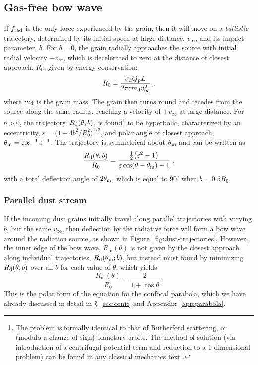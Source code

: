 \subsection{Gas-free bow wave}
\label{sec:gas-free-bow}


If \(f_{\text{rad}}\) is the only force experienced by the grain, then it will
move on a \textit{ballistic} trajectory, determined by its initial
speed at large distance, \(v_\infty\), and its impact parameter, \(b\).
For \(b = 0\), the grain radially approaches the source with initial
radial velocity \(-v_\infty\), which is decelerated to zero at the distance
of closest approach, \(R_0\), given by energy conservation:
\begin{equation}
  \label{eq:dust-r0}
  R_0 = \frac{\sigma_{\text{d}} Q_{\text{p}} L} {2 \pi c m_{\text{d}} v_\infty^2} \ ,
\end{equation}
where \(m_{\text{d}}\) is the grain mass.  The grain then turns round and
recedes from the source along the same radius, reaching a velocity of
\(+v_\infty\) at large distance.  For \(b > 0\), the trajectory,
\(R_{\text{d}}(\theta; b)\), is found\footnote{%
  The problem is formally identical to that of Rutherford scattering,
  or (modulo a change of sign) planetary orbits.  The method of
  solution (via introduction of a centrifugal potential term and
  reduction to a 1-dimensional problem) can be found in any classical
  mechanics text \citep[e.g.,][\S~14]{Landau:1976a}.} %
to be hyperbolic, characterized by an eccentricity,
\(\varepsilon = \bigl( 1 + 4 b^2 / R_0^2\bigr)^{1/2}\), and polar angle of
closest approach, \(\theta_{\text{m}} = \cos^{-1} \varepsilon^{-1}\).  The trajectory is
symmetrical about \(\theta_{\text{m}}\) and can be written as
\begin{equation}
  \label{eq:dust-r-theta}
  \frac{R_{\text{d}}(\theta; b)} {R_0} = 
  \frac{ \tfrac12 \bigl( \varepsilon^2 - 1 \bigr)} {\varepsilon \cos(\theta - \theta_{\text{m}}) - 1} \ , 
\end{equation}
with a total deflection angle of \(2 \theta_{\text{m}}\), which is equal to
\(90^\circ\) when \(b = 0.5 R_0\).

\subsubsection{Parallel dust stream}
\label{sec:dust-parallel}

If the incoming dust grains initially travel along parallel
trajectories with varying \(b\), but the same \(v_\infty\), then deflection
by the radiative force will form a bow wave around the radiation
source, as shown in Figure~\ref{fig:dust-trajectories}.  However, the
inner edge of the bow wave, \(R_{\text{in}}(\theta)\) is not given by the
closest approach along individual trajectories, \(R_{\text{d}}(\theta_{\text{m}}; b)\),
but instead must found by minimizing \(R_{\text{d}}(\theta; b)\) over all
\(b\) for each value of \(\theta\), which yields
\begin{equation}
  \label{eq:dust-r-in}
  \frac{R_{\text{in}}(\theta)} {R_0} = \frac{2}{1 + \cos\theta} \ .
\end{equation}
This is the polar form of the equation for the confocal parabola,
which we have already discussed in detail in \S~\ref{sec:conic} and
Appendix~\ref{app:parabola}.

